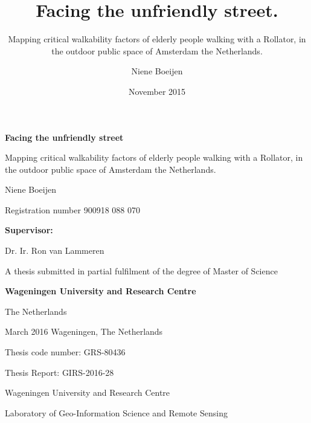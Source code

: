\documentclass[10pt,a4paper, titlepage, onecolumn, openright, twoside, justified, parskip=full, fleqn, abstract, unicode=true, pdfencoding=auto,x11names, noindent, BCOR=1cm, DIV=calc]{scrreprt}  %
\begin{document}
 
	

	\title{Facing the unfriendly street.}
	\subtitle{Mapping critical walkability factors of elderly people walking with a Rollator, in the outdoor public space of Amsterdam the Netherlands.}
	\date{November 2015}
	\author{Niene Boeijen}

	
	
	\begin{titlepage}
		\begin{center}
			\LARGE \textbf{Facing the unfriendly street}
			\vspace*{0.5cm}
			
			\Large Mapping critical walkability factors of elderly people walking with a Rollator, in the outdoor public space of Amsterdam the Netherlands. \par
			
			\vspace*{1.5cm}
			
			Niene Boeijen
			
			Registration number 900918 088 070
			
			\vspace*{1.5cm}
			
			\textbf{Supervisor:}
			
			Dr. Ir. Ron van Lammeren
			
			\vspace*{1.5cm}
			
			A thesis submitted in partial fulfilment of the degree of Master of Science
			
			\textbf{Wageningen University and Research Centre }
			
			The Netherlands
		\end{center}
		
		\vfill
		
		\begin{flushright}
			March 2016
			Wageningen, The Netherlands
		\end{flushright}
		
		\begin{flushleft}
					Thesis code number: GRS-80436
					
					Thesis Report: GIRS-2016-28			
					
					Wageningen University and Research Centre
					
					Laboratory of Geo-Information Science and Remote Sensing
		\end{flushleft}
		
	\end{titlepage}
\end{document}

